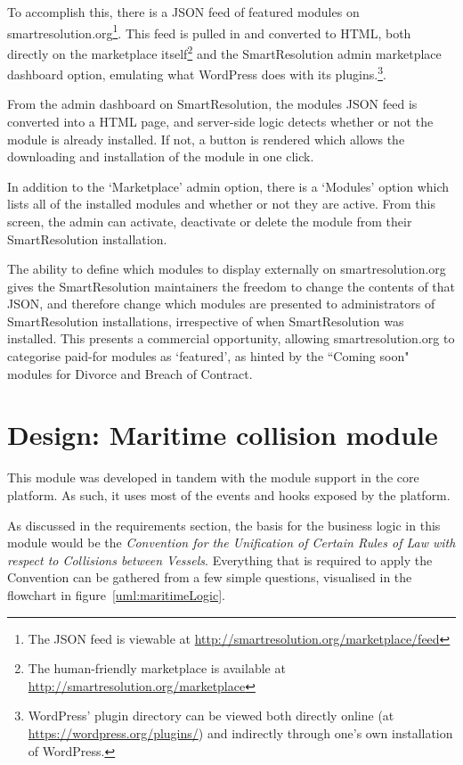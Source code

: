 To accomplish this, there is a JSON feed of featured modules on smartresolution.org\footnote{The JSON feed is viewable at \url{http://smartresolution.org/marketplace/feed}}. This feed is pulled in and converted to HTML, both directly on the marketplace itself\footnote{The human-friendly marketplace is available at \url{http://smartresolution.org/marketplace}} and the SmartResolution admin marketplace dashboard option, emulating what WordPress does with its plugins.\footnote{WordPress' plugin directory can be viewed both directly online (at \url{https://wordpress.org/plugins/}) and indirectly through one's own installation of WordPress.}.

From the admin dashboard on SmartResolution, the modules JSON feed is converted into a HTML page, and server-side logic detects whether or not the module is already installed. If not, a button is rendered which allows the downloading and installation of the module in one click.

In addition to the `Marketplace' admin option, there is a `Modules' option which lists all of the installed modules and whether or not they are active. From this screen, the admin can activate, deactivate or delete the module from their SmartResolution installation.

The ability to define which modules to display externally on smartresolution.org gives the SmartResolution maintainers the freedom to change the contents of that JSON, and therefore change which modules are presented to administrators of SmartResolution installations, irrespective of when SmartResolution was installed. This presents a commercial opportunity, allowing smartresolution.org to categorise paid-for modules as `featured', as hinted by the ``Coming soon" modules for Divorce and Breach of Contract.

\section{Design: Maritime collision module}

This module was developed in tandem with the module support in the core platform. As such, it uses most of the events and hooks exposed by the platform.

As discussed in the requirements section, the basis for the business logic in this module would be the \emph{Convention for the Unification of Certain Rules of Law with respect to Collisions between Vessels}. Everything that is required to apply the Convention can be gathered from a few simple questions, visualised in the flowchart in figure~\ref{uml:maritimeLogic}.

